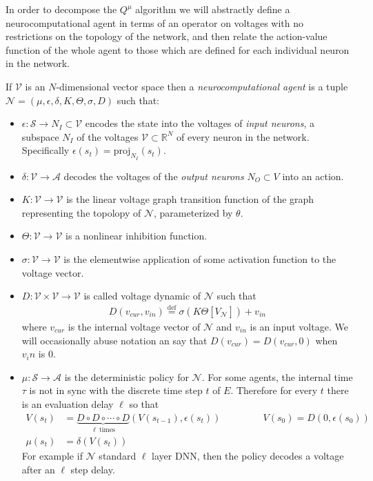 \documentclass{article} %
\numberwithin{equation}{subsection}
\numberwithin{theorem}{subsection}
\def\defeq{\stackrel{\text{def}}{=}}
\def\scriptv{{\mathcal V}}
\def\scripta{{\mathcal A}}
\def\scriptn{{\mathcal N}}
\def\scripts{{\mathcal S}}
\begin{document}
In order to decompose the $Q^\mu$ algorithm we will abstractly define a neurocomputational agent in terms of an operator on voltages with no restrictions on the topology of the network, and then relate the action-value function of the whole agent to those which are defined for each individual neuron in the network.

If $\scriptv$ is an $N$-dimensional vector space then a \emph{neurocomputational agent} is a tuple $\scriptn = (\mu, \epsilon, \delta, K, \Theta, \sigma, D)$ such that: 
\begin{itemize}
    \item $\epsilon : \scripts  \to N_I \subset \scriptv$ encodes the state into the voltages of \emph{input neurons}, a subspace $N_I$ of the voltages $\scriptv\subset \mathbb{R}^N$ of every neuron in the network. Specifically $\epsilon(s_t) = \mathrm{proj}_{N_I}(s_t)$.
    \item $\delta: \scriptv \to \scripta$ decodes the voltages of the \emph{output neurons }$N_O \subset V$ into an action.
    \item $K: \scriptv \to \scriptv$ is the linear voltage graph transition function of the graph representing the topolopy of $\scriptn$, parameterized by $\theta$.
    \item $\Theta: \scriptv \to \scriptv$ is a nonlinear inhibition function.
    \item $\sigma: \scriptv \to \scriptv$ is the elementwise application of some activation function to the voltage vector.
    \item $D: \scriptv \times \scriptv \to \scriptv$ is called voltage dynamic of $\scriptn$ such that
    \begin{equation}
        \begin{aligned}
            D(v_{cur},v_{in}) \defeq \sigma\left(K\Theta[V_{\scriptn}]\right) + v_{in}
        \end{aligned}
    \end{equation}
    where $v_{cur}$ is the internal voltage vector of $\scriptn$ and $v_{in}$ is an input voltage. We will occasionally abuse notation an say that $D(v_{cur}) = D(v_{cur}, 0)$ when $v_in$ is 0.
    \item $\mu: \scripts \to \scripta$ is the deterministic policy for $\scriptn$. For some agents, the internal time $\tau$ is not in sync with the discrete time step $t$ of $E$.  Therefore for every $t$ there is an evaluation delay  $\ell$ so that
    \begin{equation}
    	\begin{aligned}
    		V(s_t) &=  \underbrace{D \circ D \circ \cdots\circ D}_{\ell\: \mathrm{times}}(V(s_{t-1}), \epsilon(s_t))&\;\;\;\;\;\;\;\;\;\;&V(s_0) = D(0, \epsilon(s_0)) \\
    		\mu(s_t) &= \delta(V(s_t))
    	\end{aligned}
    \end{equation}
For example if $\scriptn$ standard $\ell$ layer DNN, then the policy decodes a voltage after an $\ell$ step delay.
\end{itemize}
\end{document}
